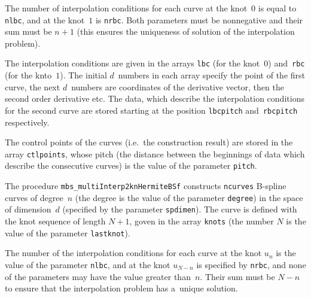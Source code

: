 The number of interpolation conditions for each curve
at the knot~$0$ is equal to \texttt{nlbc}, and at the knot~$1$ is
\texttt{nrbc}. Both parameters must be nonnegative and their sum must
be $n+1$ (this ensures the uniqueness of solution of the interpolation
problem).

The interpolation conditions are given in the arrays \texttt{lbc} (for the
knot~$0$) and~\texttt{rbc} (for the knto~$1$). The initial $d$~numbers
in each array specify the point of the first curve, the next $d$~numbers are
coordinates of the derivative vector, then the second order derivative etc.
The data, which describe the interpolation conditions for
the second curve are stored starting at the position
\texttt{lbcpitch} and~\texttt{rbcpitch} respectively.

The control points of the curves (i.e.\ the construction result)
are stored in the array \texttt{ctlpoints}, whose pitch (the distance
between the beginnings of data which describe the consecutive
curves) is the value of the parameter \texttt{pitch}.

\vspace{\bigskipamount}
\begin{sloppypar}
The procedure \texttt{mbs\_multiInterp2knHermiteBSf} constructs \texttt{ncurves}
\mbox{B-spline} curves of degree~$n$ (the degree is the value of the parameter
\texttt{degree}) in the space of dimension~$d$ (specified by the parameter
\texttt{spdimen}). The curve is defined with the knot sequence of
length $N+1$, goven in the array \texttt{knots}
(the number $N$ is the value of the parameter \texttt{lastknot}).
\end{sloppypar}

The number of the interpolation conditions for each curve
at the knot $u_n$ is the value of the parameter \texttt{nlbc}, and at the
knot $u_{N-n}$ is specified by \texttt{nrbc}, and none of the parameters may have
the value greater than~$n$. Their sum must be $N-n$ to ensure that the
interpolation problem has a~unique solution.

